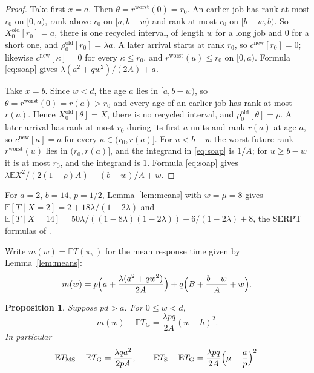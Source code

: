 \documentclass[11pt]{amsart}
\newtheorem{proposition}[theorem]{Proposition}
\theoremstyle{remark}
\numberwithin{equation}{section}
\newcommand{\E}{\mathbb{E}}
\begin{document}
\begin{proof}
Take first $x=a$. Then $\theta=r^{\mathrm{worst}}(0)=r_0$. An earlier job has
rank at most $r_0$ on $[0,a)$, rank above $r_0$ on $[a,b-w)$ and rank at most
$r_0$ on $[b-w,b)$. So $X^{\mathrm{old}}_0[r_0]=a$, there is one recycled
interval, of length $w$ for a long job and $0$ for a short one, and
$\rho^{\mathrm{old}}_0[r_0]=\lambda a$. A later arrival starts at rank
$r_0$, so $c^{\mathrm{new}}[r_0]=0$; likewise $c^{\mathrm{new}}[\kappa]=0$ for
every $\kappa\le r_0$, and $r^{\mathrm{worst}}(u)\le r_0$ on $[0,a)$.
Formula \eqref{eq:soap} gives $\lambda(a^2+qw^2)/(2A)+a$.

Take $x=b$. Since $w<d$, the age $a$ lies in $[a,b-w)$, so
$\theta=r^{\mathrm{worst}}(0)=r(a)>r_0$ and every age of an earlier job has
rank at most $r(a)$. Hence $X^{\mathrm{old}}_0[\theta]=X$, there is no
recycled interval, and $\rho^{\mathrm{old}}_0[\theta]=\rho$. A later
arrival has rank at most $r_0$ during its first $a$ units and rank $r(a)$ at
age $a$, so $c^{\mathrm{new}}[\kappa]=a$ for every $\kappa\in(r_0,r(a)]$.
For $u<b-w$ the worst future rank $r^{\mathrm{worst}}(u)$ lies in
$(r_0,r(a)]$, and the integrand in \eqref{eq:soap} is $1/A$; for $u\ge b-w$
it is at most $r_0$, and the integrand is $1$. Formula \eqref{eq:soap} gives
$\lambda\E X^2/(2(1-\rho)A)+(b-w)/A+w$.
\end{proof}

For $a=2$, $b=14$, $p=1/2$, Lemma~\ref{lem:means} with $w=\mu=8$ gives
$\E[T\mid X=2]=2+18\lambda/(1-2\lambda)$ and $\E[T\mid X=14]=50\lambda/((1-8\lambda)(1-2\lambda))+6/(1-2\lambda)+8$,
the SERPT formulas of \cite[Section~6.4]{SHS18}.

Write $m(w)=\E T(\pi_w)$ for the mean response time given by Lemma~\ref{lem:means}:
\begin{equation}\label{eq:Tw}
m(w)=p\Bigl(a+\frac{\lambda(a^2+qw^2)}{2A}\Bigr)+q\Bigl(B+\frac{b-w}{A}+w\Bigr).
\end{equation}

\begin{proposition}\label{prop:regret}
Suppose $pd>a$. For $0\le w<d$,
\[
m(w)-\E T_{\mathrm G}=\frac{\lambda pq}{2A}(w-h)^2 .
\]
In particular
\begin{equation}\label{eq:gaps}
\E T_{\mathrm{MS}}-\E T_{\mathrm G}=\frac{\lambda qa^2}{2pA},\qquad
\E T_{\mathrm S}-\E T_{\mathrm G}=\frac{\lambda pq}{2A}\Bigl(\mu-\frac ap\Bigr)^2 .
\end{equation}
\end{proposition}
\end{document}
